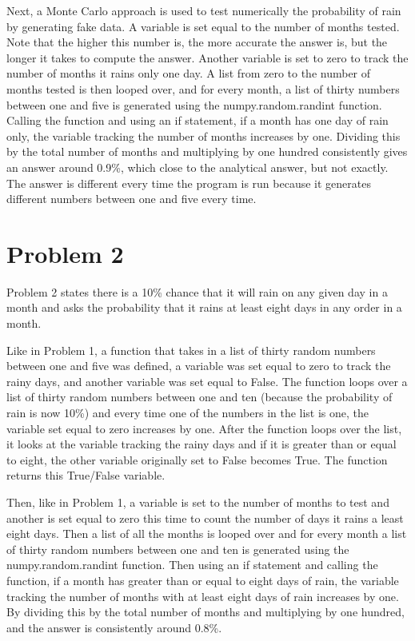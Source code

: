 \documentclass[12pt]{article}
\begin{document}
	Next, a Monte Carlo approach is used to test numerically the probability of rain by 
	generating fake data. A variable is set equal to the number of months tested. Note that
	the higher this
	number is, the more accurate the answer is, but the longer it takes to compute the 
	answer. Another variable is set to zero to track the number of months it rains only one 
	day. A list from zero to the number of months tested is then looped over, and for every 
	month, a list of thirty 	numbers between one and five is generated using the 
	numpy.random.randint function. Calling the function and using an if 
	statement, if a month has one day of rain only, the variable tracking the number 
	of months increases by one. Dividing this by the total number of months and multiplying
	 by one hundred consistently gives an answer around 0.9\%, which close to the 
	analytical answer, but not exactly. The answer is different every time the program is run 
	because it generates different numbers between one and five every time.

\section{Problem 2}

	Problem 2 states there is a 10\% chance that it will rain on any given day in a month
	 and asks the probability that it rains at least eight days in any order in a month.
	 
	Like in Problem 1, a function that takes in a list of thirty random numbers between one 
	and five was defined, a variable was set equal to zero to track the rainy days, and
	another variable was set equal to False. The function loops over a list of thirty random 
	numbers between one and ten (because the probability of rain is now 10\%) and every
	time one of the numbers in the list is one, the variable set equal to zero increases by
	 one. After the function loops over the list, it looks at the  
	variable tracking the rainy days and if it is greater than or equal to eight, the other 
	variable originally set to False becomes True. The function returns this True/False
	variable.
	
	Then, like in Problem 1, a variable is set to the number of months to test and another 
	is set equal to zero this time to count the number of days it rains a least eight days.
	Then a list of all the months is looped over and for every month a list of thirty random 
	numbers between one and ten is generated using the numpy.random.randint function. 
	Then using an if statement and calling the function, if a month has greater than or equal 
	to eight days of rain, the variable tracking the number of months with at least eight days
	of rain increases by one. By dividing this by the total number of months and multiplying
	 by one hundred, and the answer is consistently around 0.8\%.
\end{document}
